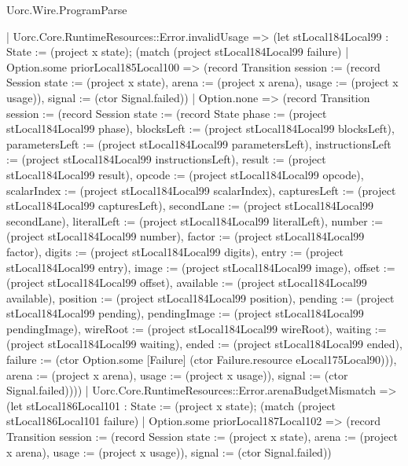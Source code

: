 \begin{lexlean}{Uorc.Wire.ProgramParse}
\begin{semanticmodule}
{      | Uorc.Core.RuntimeResources::Error.invalidUsage => (let stLocal184Local99 : State := (project x state); (match (project stLocal184Local99 failure)
        | Option.some priorLocal185Local100 => (record Transition {session := (record Session {state := (project x state), arena := (project x arena), usage := (project x usage)}), signal := (ctor Signal.failed)})
        | Option.none => (record Transition {session := (record Session {state := (record State {phase := (project stLocal184Local99 phase), blocksLeft := (project stLocal184Local99 blocksLeft), parametersLeft := (project stLocal184Local99 parametersLeft), instructionsLeft := (project stLocal184Local99 instructionsLeft), result := (project stLocal184Local99 result), opcode := (project stLocal184Local99 opcode), scalarIndex := (project stLocal184Local99 scalarIndex), capturesLeft := (project stLocal184Local99 capturesLeft), secondLane := (project stLocal184Local99 secondLane), literalLeft := (project stLocal184Local99 literalLeft), number := (project stLocal184Local99 number), factor := (project stLocal184Local99 factor), digits := (project stLocal184Local99 digits), entry := (project stLocal184Local99 entry), image := (project stLocal184Local99 image), offset := (project stLocal184Local99 offset), available := (project stLocal184Local99 available), position := (project stLocal184Local99 position), pending := (project stLocal184Local99 pending), pendingImage := (project stLocal184Local99 pendingImage), wireRoot := (project stLocal184Local99 wireRoot), waiting := (project stLocal184Local99 waiting), ended := (project stLocal184Local99 ended), failure := (ctor Option.some [Failure] (ctor Failure.resource eLocal175Local90))}), arena := (project x arena), usage := (project x usage)}), signal := (ctor Signal.failed)})))
      | Uorc.Core.RuntimeResources::Error.arenaBudgetMismatch => (let stLocal186Local101 : State := (project x state); (match (project stLocal186Local101 failure)
        | Option.some priorLocal187Local102 => (record Transition {session := (record Session {state := (project x state), arena := (project x arena), usage := (project x usage)}), signal := (ctor Signal.failed)})
}
\end{semanticmodule}
\end{lexlean}
